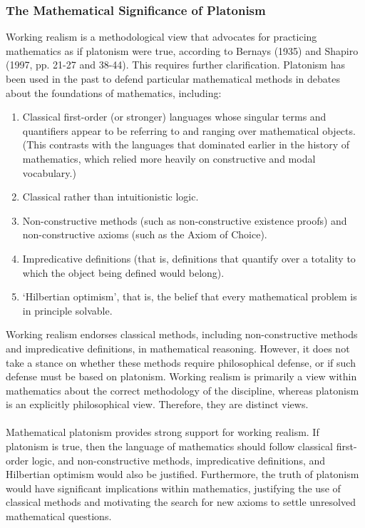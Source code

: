 \documentclass[10pt,a4paper]{article}
\begin{document}
                    \subsubsection{The Mathematical Significance of Platonism}
                        Working realism is a methodological view that advocates for practicing mathematics as if platonism were true, according to Bernays (1935) and Shapiro (1997, pp. 21-27 and 38-44). This requires further clarification. Platonism has been used in the past to defend particular mathematical methods in debates about the foundations of mathematics, including:
                        \begin{enumerate}
                            \item Classical first-order (or stronger) languages whose singular terms and quantifiers appear to be referring to and ranging over mathematical objects. (This contrasts with the languages that dominated earlier in the history of mathematics, which relied more heavily on constructive and modal vocabulary.)
                            \item Classical rather than intuitionistic logic.
                            \item Non-constructive methods (such as non-constructive existence proofs) and non-constructive axioms (such as the Axiom of Choice).
                            \item Impredicative definitions (that is, definitions that quantify over a totality to which the object being defined would belong).
                            \item ‘Hilbertian optimism’, that is, the belief that every mathematical problem is in principle solvable.
                          \end{enumerate}
                        Working realism endorses classical methods, including non-constructive methods and impredicative definitions, in mathematical reasoning. However, it does not take a stance on whether these methods require philosophical defense, or if such defense must be based on platonism. Working realism is primarily a view within mathematics about the correct methodology of the discipline, whereas platonism is an explicitly philosophical view. Therefore, they are distinct views.
                        \\
                        \\
                        Mathematical platonism provides strong support for working realism. If platonism is true, then the language of mathematics should follow classical first-order logic, and non-constructive methods, impredicative definitions, and Hilbertian optimism would also be justified. Furthermore, the truth of platonism would have significant implications within mathematics, justifying the use of classical methods and motivating the search for new axioms to settle unresolved mathematical questions.
\end{document}

